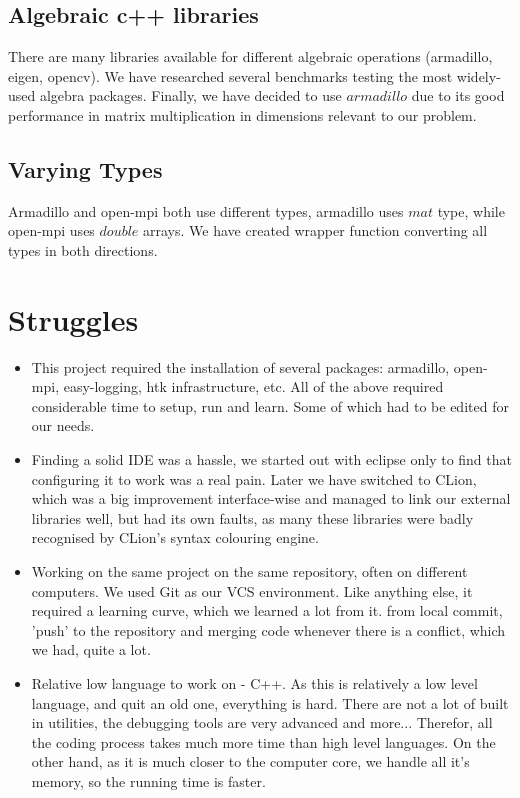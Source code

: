 \documentclass[12pt,a4paper]{article}
\begin{document}
\subsection{Algebraic c++ libraries}
There are many libraries available for different algebraic operations (armadillo, eigen, opencv).
We have researched several benchmarks testing the most widely-used algebra packages. Finally, we have decided to use $armadillo$ due to its good performance in matrix multiplication in dimensions relevant to our problem.

\subsection{Varying Types}
Armadillo and open-mpi both use different types, armadillo uses $mat$ type, while open-mpi uses $double$ arrays. We have created wrapper function converting all types in both directions.

\section{Struggles}
\begin{itemize}
\item This project required the installation of several packages: armadillo, open-mpi, easy-logging, htk infrastructure, etc. All of the above required considerable time to setup, run and learn. Some of which had to be edited for our needs.
\item Finding a solid IDE was a hassle, we started out with eclipse only to find that configuring it to work was a real pain. Later we have switched to CLion, which was a big improvement interface-wise and managed to link our external libraries well, but had its own faults, as many these libraries were badly recognised by CLion's syntax colouring engine.
\item Working on the same project on the same repository, often on different computers. We used Git as our VCS environment. Like anything else, it required a learning curve, which we learned a lot from it. from local commit, 'push' to the repository and merging code whenever there is a conflict, which we had, quite a lot. 
\item Relative low language to work on - C++. As this is relatively a low level language, and quit an old one, everything is hard. There are not a lot of built in utilities, the debugging tools are very advanced and more... Therefor, all the coding process takes much more time than high level languages. On the other hand, as it is much closer to the computer core, we handle all it's memory, so the running time is faster.
\end{itemize}
\end{document}
